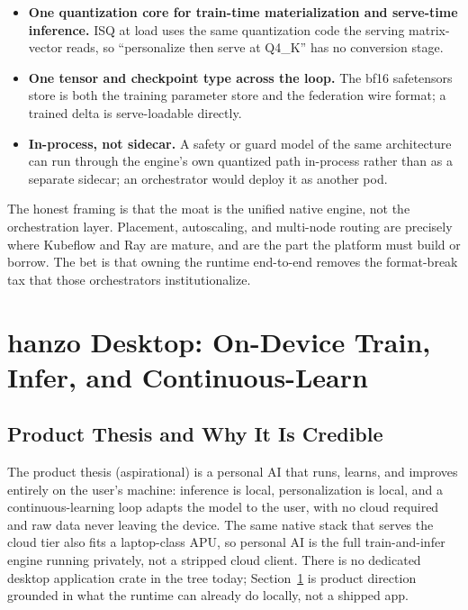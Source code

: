 \documentclass[11pt]{article}
\begin{document}
\begin{itemize}
\item \textbf{One quantization core for train-time materialization and serve-time inference.} ISQ at load uses the same quantization code the serving matrix-vector reads, so ``personalize then serve at Q4\_K'' has no conversion stage.
\item \textbf{One tensor and checkpoint type across the loop.} The bf16 safetensors store is both the training parameter store and the federation wire format; a trained delta is serve-loadable directly.
\item \textbf{In-process, not sidecar.} A safety or guard model of the same architecture can run through the engine's own quantized path in-process rather than as a separate sidecar; an orchestrator would deploy it as another pod.
\end{itemize}

The honest framing is that the moat is the unified native engine, not the orchestration layer. Placement, autoscaling, and multi-node routing are precisely where Kubeflow and Ray are mature, and are the part the platform must build or borrow. The bet is that owning the runtime end-to-end removes the format-break tax that those orchestrators institutionalize.

\section{hanzo Desktop: On-Device Train, Infer, and Continuous-Learn}
\label{sec:desktop}

\subsection{Product Thesis and Why It Is Credible}

The product thesis (aspirational) is a personal AI that runs, learns, and improves entirely on the user's machine: inference is local, personalization is local, and a continuous-learning loop adapts the model to the user, with no cloud required and raw data never leaving the device. The same native stack that serves the cloud tier also fits a laptop-class APU, so personal AI is the full train-and-infer engine running privately, not a stripped cloud client. There is no dedicated desktop application crate in the tree today; Section~\ref{sec:desktop} is product direction grounded in what the runtime can already do locally, not a shipped app.
\end{document}
